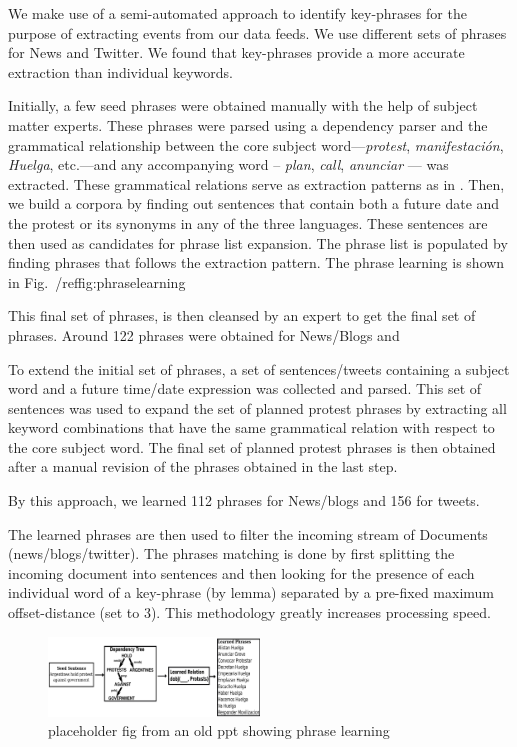 We make use of a semi-automated approach to identify key-phrases for the purpose of extracting events from our data feeds. We use different sets of phrases for News and Twitter. We found that key-phrases provide a more accurate extraction than individual keywords.

Initially, a few seed phrases were obtained manually
with the help of subject matter experts. These phrases were parsed
using a dependency parser and the grammatical relationship between the
core subject word---{\em protest}, {\em manifestación}, {\em Huelga},
etc.---and any accompanying word -- {\em plan}, {\em call}, {\em anunciar} --- was extracted. These grammatical relations serve as extraction patterns as in \cite{riloff2003learning}. Then, we build a corpora by finding out sentences that contain both a future date and the protest or its synonyms in any of the three languages. These sentences are then used as candidates for phrase list expansion. The phrase list is populated by finding phrases that follows the extraction pattern.
The phrase learning is shown in Fig.~/ref{fig:phraselearning}

This final set of phrases, is then cleansed by an expert to get the final set of phrases. Around 122 phrases were obtained for News/Blogs and 

To extend the initial set of phrases, a set of sentences/tweets containing a subject word and a
future time/date expression was collected and parsed.  This set of
sentences was used to expand the set of planned protest phrases by
extracting all keyword combinations that have the same grammatical
relation with respect to the core subject word. The final set of
planned protest phrases is then obtained after a manual revision of
the phrases obtained in the last step.

By this approach, we learned 112 phrases for News/blogs and 156 for tweets.

The learned phrases are then used to filter the incoming stream of Documents (news/blogs/twitter). The phrases matching is done by first splitting the incoming document into sentences and then looking for the presence of each individual word of a key-phrase (by lemma) separated by a pre-fixed maximum offset-distance (set to 3). This methodology greatly increases processing speed.

\begin{figure}
\caption{placeholder fig from an old ppt showing phrase learning}
\includegraphics[width=0.5\textwidth]{figures/phraseLearning}
\end{figure}
